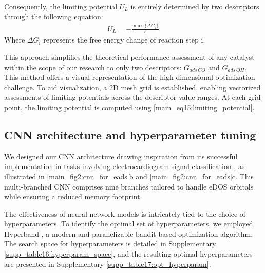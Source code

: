 \documentclass[a4paper, 12pt, titlepage]{article}
\begin{document}
    Consequently, the limiting potential $\textit{U}_{L}$ is entirely determined by two descriptors through the following equation:
    \begin{align}
    U_L = -\frac{\max\{ \Delta G_i \}}{e}  \label{main_eq15:limiting_potential}
    \end{align}
    Where $\Delta G_{i}$ represents the free energy change of reaction step i.

    This approach simplifies the theoretical performance assessment of any catalyst within the scope of our research to only two descriptors: $G_{\textit{ads} \, \textit{CO}}$ and $G_{\textit{ads} \, \textit{OH}}$.
    This method offers a visual representation of the high-dimensional optimization challenge.
    To aid visualization, a 2D mesh grid is established, enabling vectorized assessments of limiting potentials across the descriptor value ranges.
    At each grid point, the limiting potential is computed using \cref{main_eq15:limiting_potential}.


    \subsection{CNN architecture and hyperparameter tuning}
    We designed our CNN architecture drawing inspiration from its successful implementation in tasks involving electrocardiogram signal classification \cite{weimann2021transfer}, as illustrated in \cref{main_fig2:cnn_for_eads}b and \cref{main_fig2:cnn_for_eads}c.
    This multi-branched CNN comprises nine branches tailored to handle eDOS orbitals while ensuring a reduced memory footprint.

    The effectiveness of neural network models is intricately tied to the choice of hyperparameters.
    To identify the optimal set of hyperparameters, we employed Hyperband \cite{li2018hyperband}, a modern and parallelizable bandit-based optimization algorithm.
    The search space for hyperparameters is detailed in Supplementary \cref{supp_table16:hyperparam_space}, and the resulting optimal hyperparameters are presented in Supplementary \cref{supp_table17:opt_hyperparam}.
\end{document}

